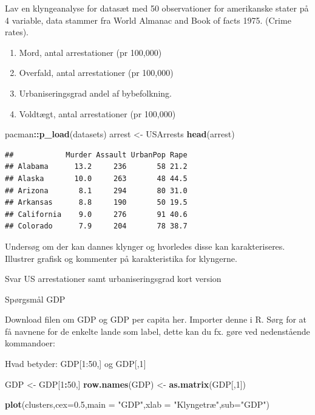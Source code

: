 \documentclass[]{book}
\newenvironment{Shaded}{\begin{snugshade}}{\end{snugshade}}
\newcommand{\DataTypeTok}[1]{\textcolor[rgb]{0.13,0.29,0.53}{#1}}
\newcommand{\DecValTok}[1]{\textcolor[rgb]{0.00,0.00,0.81}{#1}}
\newcommand{\FloatTok}[1]{\textcolor[rgb]{0.00,0.00,0.81}{#1}}
\newcommand{\KeywordTok}[1]{\textcolor[rgb]{0.13,0.29,0.53}{\textbf{#1}}}
\newcommand{\NormalTok}[1]{#1}
\newcommand{\OperatorTok}[1]{\textcolor[rgb]{0.81,0.36,0.00}{\textbf{#1}}}
\newcommand{\StringTok}[1]{\textcolor[rgb]{0.31,0.60,0.02}{#1}}
\providecommand{\tightlist}{%
  \setlength{\itemsep}{0pt}\setlength{\parskip}{0pt}}
\begin{document}
Lav en klyngeanalyse for datasæt med 50 observationer for amerikanske stater på 4 variable, data stammer fra World Almanac and Book of facts 1975. (Crime rates).

\begin{enumerate}
\def\labelenumi{\arabic{enumi}.}
\tightlist
\item
  Mord, antal arrestationer (pr 100,000)
\item
  Overfald, antal arrestationer (pr 100,000)
\item
  Urbaniseringsgrad andel af bybefolkning.
\item
  Voldtægt, antal arrestationer (pr 100,000)
\end{enumerate}

\begin{Shaded}
\begin{Highlighting}[]
\NormalTok{pacman}\OperatorTok{::}\KeywordTok{p_load}\NormalTok{(datasets)}
\NormalTok{arrest <-}\StringTok{ }\NormalTok{USArrests}
\KeywordTok{head}\NormalTok{(arrest)}
\end{Highlighting}
\end{Shaded}

\begin{verbatim}
##            Murder Assault UrbanPop Rape
## Alabama      13.2     236       58 21.2
## Alaska       10.0     263       48 44.5
## Arizona       8.1     294       80 31.0
## Arkansas      8.8     190       50 19.5
## California    9.0     276       91 40.6
## Colorado      7.9     204       78 38.7
\end{verbatim}

Undersøg om der kan dannes klynger og hvorledes disse kan karakteriseres. Illustrer grafisk og kommenter på karakteristika for klyngerne.

Svar US arrestationer samt urbaniseringsgrad kort version

Spørgsmål GDP

Download filen om GDP og GDP per capita her. Importer denne i R. Sørg for at få navnene for de enkelte lande som label, dette kan du fx. gøre ved nedenstående kommandoer:

Hvad betyder:
GDP{[}1:50,{]}
og
GDP{[},1{]}

\begin{Shaded}
\begin{Highlighting}[]
\NormalTok{GDP <-}\StringTok{ }\NormalTok{GDP[}\DecValTok{1}\OperatorTok{:}\DecValTok{50}\NormalTok{,]}
\KeywordTok{row.names}\NormalTok{(GDP) <-}\StringTok{ }\KeywordTok{as.matrix}\NormalTok{(GDP[,}\DecValTok{1}\NormalTok{])}

\KeywordTok{plot}\NormalTok{(clusters,}\DataTypeTok{cex=}\FloatTok{0.5}\NormalTok{,}\DataTypeTok{main =} \StringTok{"GDP"}\NormalTok{,}\DataTypeTok{xlab =} \StringTok{"Klyngetræ"}\NormalTok{,}\DataTypeTok{sub=}\StringTok{"GDP"}\NormalTok{)}
\end{Highlighting}
\end{Shaded}
\end{document}
